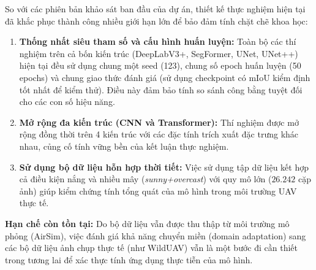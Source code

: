 So với các phiên bản khảo sát ban đầu của dự án, thiết kế thực nghiệm hiện tại đã khắc phục thành công nhiều giới hạn lớn để bảo đảm tính chặt chẽ khoa học:
\begin{enumerate}[leftmargin=1.4cm]
  \item \textbf{Thống nhất siêu tham số và cấu hình huấn luyện:} Toàn bộ các thí nghiệm trên cả bốn kiến trúc (DeepLabV3+, SegFormer, UNet, UNet++) hiện tại đều sử dụng chung một seed (123), chung số epoch huấn luyện (50 epochs) và chung giao thức đánh giá (sử dụng checkpoint có mIoU kiểm định tốt nhất để kiểm thử). Điều này đảm bảo tính so sánh công bằng tuyệt đối cho các con số hiệu năng.
  \item \textbf{Mở rộng đa kiến trúc (CNN và Transformer):} Thí nghiệm được mở rộng đồng thời trên 4 kiến trúc với các đặc tính trích xuất đặc trưng khác nhau, củng cố tính vững bền của kết luận thực nghiệm.
  \item \textbf{Sử dụng bộ dữ liệu hỗn hợp thời tiết:} Việc sử dụng tập dữ liệu kết hợp cả điều kiện nắng và nhiều mây (\textit{sunny+overcast}) với quy mô lớn ($26.242$ cặp ảnh) giúp kiểm chứng tính tổng quát của mô hình trong môi trường UAV thực tế.
\end{enumerate}

\noindent\textbf{Hạn chế còn tồn tại:} Do bộ dữ liệu vẫn được thu thập từ môi trường mô phỏng (AirSim), việc đánh giá khả năng chuyển miền (domain adaptation) sang các bộ dữ liệu ảnh chụp thực tế (như WildUAV) vẫn là một bước đi cần thiết trong tương lai để xác thực tính ứng dụng thực tiễn của mô hình.
